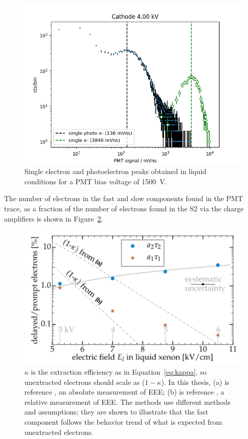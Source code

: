 \begin{figure}[htbp]
\begin{center}
\includegraphics[width=\textwidth]{figures/etrains/single_e.png}
\caption{Single electron and photoelectron peaks obtained in liquid conditions for a \acs{PMT} bias voltage of 1500~V.}
\label{fig:single_e}
\end{center}
\end{figure}

The number of electrons in the fast and slow components found in the \ac{PMT} trace, as a fraction of the number of electrons found in the S2 via the charge amplifiers is shown in Figure~\ref{fig:etrain_result1}.


\begin{figure}[htbp]
\begin{center}
\includegraphics[width=\textwidth]{figures/etrains/etrain_result1.png}
\caption{$\kappa$ is the extraction efficiency as in Equation~\ref{eq:kappa}, so unextracted electrons should scale as ($1-\kappa$). In this thesis, (a) is reference \cite{Gushchin1982}, an absolute measurement of \acs{EEE}; (b) is reference \cite{Edwards2018}, a relative measurement of \acs{EEE}. The methods use different methods and assumptions; they are shown to illustrate that the fast component follows the behavior trend of what is expected from unextracted electrons.}
\label{fig:etrain_result1}
\end{center}
\end{figure}

